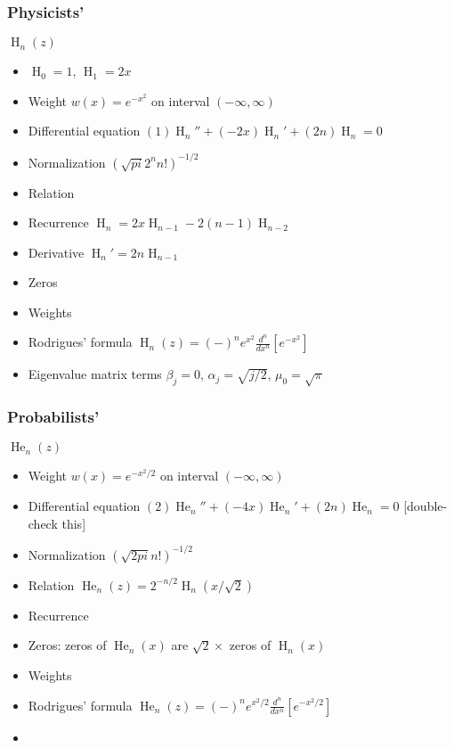 \documentclass[10pt,dvipdfmx,letterpaper,twoside]{article}
\let\O=\operatorname
\let\al=\alpha
\begin{document}
\subsubsection{Physicists'}
$\O{H}_n(z)$
\begin{itemize}
\item $\O{H}_0 = 1$, $\O{H}_1 = 2x$
\item Weight $w(x) = e^{-x^2}$ on interval $(-\infty,\infty)$
\item Differential equation $\left(1\right) \O{H}_n'' + \left(-2x\right) \O{H}_n' + \left(2n\right) \O{H}_n = 0$
\item Normalization $(\sqrt{pi}2^n n!)^{-1/2}$
\item Relation 
\item Recurrence $\O{H}_n = 2x\O{H}_{n-1} - 2(n-1)\O{H}_{n-2}$
\item Derivative $\O{H}_n' = 2n \O{H}_{n-1}$
\item Zeros
\item Weights
\item Rodrigues' formula $\O{H}_n(z) = (-)^n e^{x^2} \frac{d^n}{dx^n}\left[ e^{-x^2} \right]$
\item Eigenvalue matrix terms $\beta_j = 0$, $\al_j = \sqrt{j/2}$, $\mu_0 = \sqrt\pi$
\end{itemize}

\subsubsection{Probabilists'}
$\O{He}_n(z)$
\begin{itemize}
\item Weight $w(x) = e^{-x^2/2}$ on interval $(-\infty,\infty)$
\item Differential equation $\left(2\right) \O{He}_n'' + \left(-4x\right) \O{He}_n' + \left(2n\right) \O{He}_n = 0$
  [double-check this]
\item Normalization $(\sqrt{2pi}n!)^{-1/2}$
\item Relation $\O{He}_n(z) = 2^{-n/2}\O{H}_n(x/\sqrt2)$
\item Recurrence
\item Zeros: zeros of $\O{He}_n(x)$ are $\sqrt{2} \times$ zeros of $\O{H}_n(x)$
\item Weights
\item Rodrigues' formula $\O{He}_n(z) = (-)^n e^{x^2/2} \frac{d^n}{dx^n}\left[ e^{-x^2/2} \right]$
\item 
\end{itemize}
\end{document}
